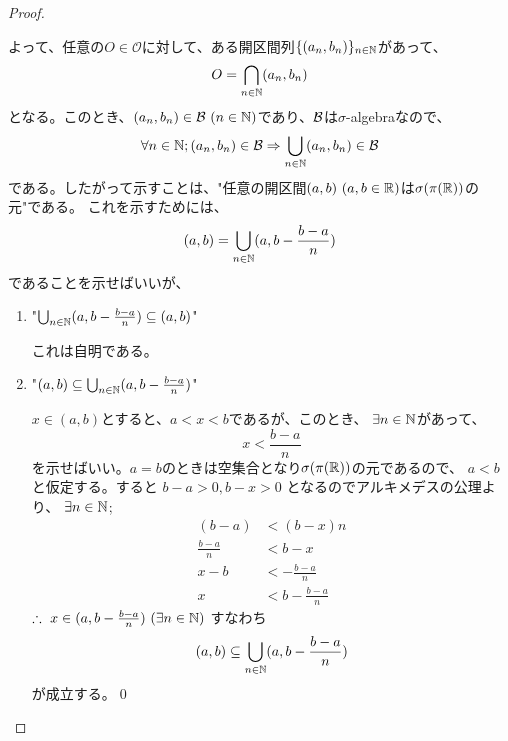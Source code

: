 \begin{proof}
\begin{enumerate}[font = \bfseries, label = step \arabic*.]
                    よって、任意の$O\in\mathcal{O}$に対して、ある開区間列$\{(a_n, b_n)\}_{n\in{\mathbb{N}}}$があって、
                    \[
                        O = \bigcap_{n\in{\mathbb{N}}} (a_n, b_n)
                    \]
                    となる。このとき、$(a_n, b_n)\in\BB\ (n\in\NN)$であり、${\mathcal{B}}$は$\sigma$-algebraなので、
                    \[
                        \forall n \in {\mathbb{N}}; (a_n, b_n)\in{\mathcal{B}}\Rightarrow \bigcup_{n\in{\mathbb{N}}}(a_n, b_n)\in{\mathcal{B}}
                    \]
                    である。したがって示すことは、"任意の開区間$(a, b)\ (a, b\in {\mathbb{R}})$は$\sigma(\pi({\mathbb{R}}))$の元"である。
                    これを示すためには、
                    \[
                        (a, b) = \bigcup_{n\in{\mathbb{N}}}(a, b - \frac{b - a}{n})
                    \]
                    であることを示せばいいが、
                    \begin{enumerate}
                        \item "$\bigcup_{n\in{\mathbb{N}}}(a, b - \frac{b - a}{n}) \subseteq (a, b)$"\par
                            これは自明である。
                        \item "$(a, b) \subseteq \bigcup_{n\in{\mathbb{N}}}(a, b - \frac{b - a}{n})$"\par
                            $x \in (a, b)$とすると、$a < x < b$であるが、このとき、
                            $\exists n\in {\mathbb{N}}$があって、
                            \[
                                x < \frac{b-a}{n}
                            \]
                            を示せばいい。$a = b$のときは空集合となり$\sigma(\pi({\mathbb{R}}))$の元であるので、
                            $a < b$と仮定する。すると
                            $b - a > 0, b - x > 0$
                            となるのでアルキメデスの公理より、
                            $\exists n \in {\mathbb{N}}$;
                            \begin{align*}
                                (b-a) &< (b-x)n \\
                                \frac{b-a}{n} &< b-x \\
                                x - b &< -\frac{b-a}{n} \\
                                x &< b - \frac{b-a}{n}
                            \end{align*}
                            $\therefore\ x\in (a, b - \frac{b-a}{n})\ (\exists n\in {\mathbb{N}})$
                            すなわち
                            \[
                                (a, b) \subseteq \bigcup_{n\in{\mathbb{N}}}(a, b - \frac{b - a}{n})
                            \]
                            が成立する。\qed
                    \end{enumerate}
            \end{enumerate}
        \end{proof}
    